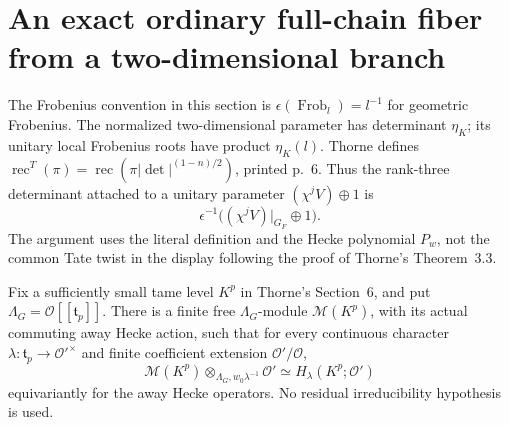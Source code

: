 \section{An exact ordinary full-chain fiber from a two-dimensional branch}
\label{sec:cubic-exact-ordinary-fiber}

The Frobenius convention in this section is
\(\epsilon(\operatorname{Frob}_l)=l^{-1}\) for geometric Frobenius.
The normalized two-dimensional parameter has determinant \(\eta_K\);
its unitary local Frobenius roots have product \(\eta_K(l)\).
Thorne defines
\(\operatorname{rec}^T(\pi)=\operatorname{rec}
(\pi|\det|^{(1-n)/2})\), printed p.~6.
Thus the rank-three determinant attached to a unitary parameter
\((\chi^j V)\oplus1\) is
\[
       \epsilon^{-1}\bigl((\chi^j V)|_{G_F}\oplus1\bigr).
       \tag{G78.1}
\]
The argument uses the literal definition and the Hecke polynomial
\(P_w\), not the common Tate twist in the display following the
proof of Thorne's Theorem~3.3.

\begin{lemma}
\label{lem:G78-universal}
Fix a sufficiently small tame level \(K^p\) in Thorne's Section~6,
and put \(\Lambda_G=\mathcal O[[\mathfrak t_p]]\).
There is a finite free \(\Lambda_G\)-module \(\mathscr M(K^p)\),
with its actual commuting away Hecke action, such that for every
continuous character \(\lambda:\mathfrak t_p\to\mathcal O'^\times\)
and finite coefficient extension \(\mathcal O'/\mathcal O\),
\[
 \mathscr M(K^p)\otimes_{\Lambda_G,w_0\lambda^{-1}}\mathcal O'
       \simeq H_\lambda(K^p;\mathcal O')
       \tag{G78.2}
\]
equivariantly for the away Hecke operators.
No residual irreducibility hypothesis is used.
\end{lemma}

